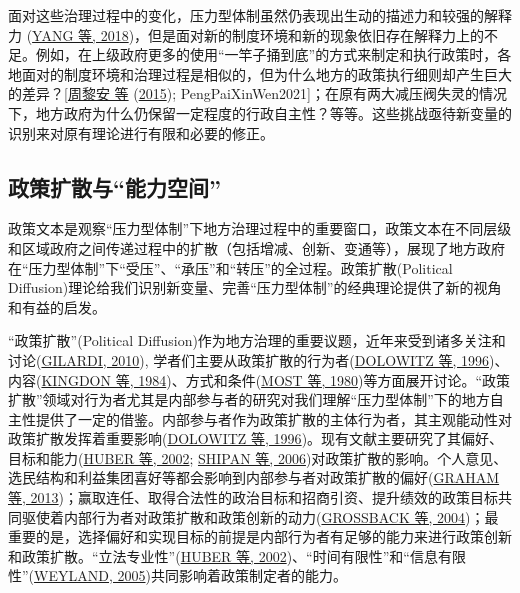 \documentclass[
  12pt,
]{ctexart}
\begin{document}
面对这些治理过程中的变化，压力型体制虽然仍表现出生动的描述力和较强的解释力 (\protect\hyperlink{ref-YangYan2018}{YANG 等, 2018})，但是面对新的制度环境和新的现象依旧存在解释力上的不足。例如，在上级政府更多的使用``一竿子捅到底''的方式来制定和执行政策时，各地面对的制度环境和治理过程是相似的，但为什么地方的政策执行细则却产生巨大的差异？{[}\protect\hyperlink{ref-ZhouLiAnEtAl2015}{周黎安 等} (\protect\hyperlink{ref-ZhouLiAnEtAl2015}{2015}); PengPaiXinWen2021{]}；在原有两大减压阀失灵的情况下，地方政府为什么仍保留一定程度的行政自主性？等等。这些挑战亟待新变量的识别来对原有理论进行有限和必要的修正。

\hypertarget{ux653fux7b56ux6269ux6563ux4e0eux80fdux529bux7a7aux95f4}{%
\subsection{政策扩散与``能力空间''}\label{ux653fux7b56ux6269ux6563ux4e0eux80fdux529bux7a7aux95f4}}

政策文本是观察``压力型体制''下地方治理过程中的重要窗口，政策文本在不同层级和区域政府之间传递过程中的扩散（包括增减、创新、变通等），展现了地方政府在``压力型体制''下``受压''、``承压''和``转压''的全过程。政策扩散(Political Diffusion)理论给我们识别新变量、完善``压力型体制''的经典理论提供了新的视角和有益的启发。

``政策扩散''(Political Diffusion)作为地方治理的重要议题，近年来受到诸多关注和讨论(\protect\hyperlink{ref-Gilardi2010}{GILARDI, 2010}), 学者们主要从政策扩散的行为者(\protect\hyperlink{ref-DolowitzMarsh1996}{DOLOWITZ 等, 1996})、内容(\protect\hyperlink{ref-KingdonStano1984}{KINGDON 等, 1984})、方式和条件(\protect\hyperlink{ref-MostStarr1980}{MOST 等, 1980})等方面展开讨论。``政策扩散''领域对行为者尤其是内部参与者的研究对我们理解``压力型体制''下的地方自主性提供了一定的借鉴。内部参与者作为政策扩散的主体行为者，其主观能动性对政策扩散发挥着重要影响(\protect\hyperlink{ref-DolowitzMarsh1996}{DOLOWITZ 等, 1996})。现有文献主要研究了其偏好、目标和能力(\protect\hyperlink{ref-HuberShipan2002}{HUBER 等, 2002}; \protect\hyperlink{ref-ShipanVolden2006a}{SHIPAN 等, 2006})对政策扩散的影响。个人意见、选民结构和利益集团喜好等都会影响到内部参与者对政策扩散的偏好(\protect\hyperlink{ref-GrahamEtAl2013a}{GRAHAM 等, 2013})；赢取连任、取得合法性的政治目标和招商引资、提升绩效的政策目标共同驱使着内部行为者对政策扩散和政策创新的动力(\protect\hyperlink{ref-GrossbackEtAl2004}{GROSSBACK 等, 2004})；最重要的是，选择偏好和实现目标的前提是内部行为者有足够的能力来进行政策创新和政策扩散。``立法专业性''(\protect\hyperlink{ref-HuberShipan2002}{HUBER 等, 2002})、``时间有限性''和``信息有限性''(\protect\hyperlink{ref-Weyland2005}{WEYLAND, 2005})共同影响着政策制定者的能力。
\end{document}
